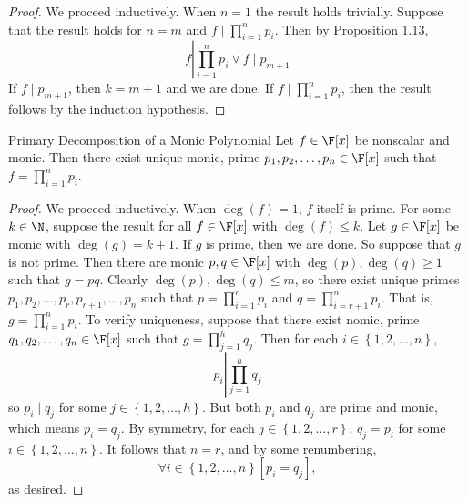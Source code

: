 \documentclass[linearalgebraII]{subfiles}
\begin{document}
    \begin{proof}
        We proceed inductively. When $n=1$ the result holds trivially. Suppose that the result holds for $n=m$ and $f\mid \prod^n_{i=1} p_i$. Then by Proposition 1.13,
        \begin{equation*}
            f\left|\prod^n_{i=1} p_i \lor f\mid p_{m+1}\right.
        \end{equation*}
        If $f\mid p_{m+1}$, then $k=m+1$ and we are done. If $f\mid\prod^n_{i=1} p_i$, then the result follows by the induction hypothesis.
    \end{proof}

    \begin{theorem}{Primary Decomposition of a Monic Polynomial}
        Let $f\in \F[x]$ be nonscalar and monic. Then there exist unique monic, prime $p_1, p_2, \ldots, p_n\in \F[x]$ such that $f = \prod^n_{i=1} p_i$.
    \end{theorem}

    \begin{proof}
        We proceed inductively. When $\deg(f)=1$, $f$ itself is prime. For some $k\in \N$, suppose the result for all $f\in \F[x]$ with $\deg(f)\leq k$. Let $g\in \F[x]$ be monic with $\deg(g) = k+1$. If $g$ is prime, then we are done. So suppose that $g$ is not prime. Then there are monic $p, q\in \F[x]$ with $\deg(p),\deg(q)\geq 1$ such that $g=pq$. Clearly $\deg(p), \deg(q)\leq m$, so there exist unique primes $p_1, p_2, \ldots, p_r, p_{r+1}, \ldots, p_n$ such that $p =
        \prod^{r}_{i=1} p_i$ and $q = \prod^{n}_{i=r+1} p_i$. That is, $g = \prod^{n}_{i=1} p_i$. To verify uniqueness, suppose that there exist nomic, prime $q_1, q_2, \ldots, q_n\in \F[x]$ such that $g = \prod^{h}_{j=1} q_j$. Then for each $i\in \left\lbrace 1, 2, \ldots, n \right\rbrace$,
        \begin{equation*}
            p_i \left| \prod^{h}_{j=1} q_j\right. 
        \end{equation*}
        so $p_i\mid q_j$ for some $j\in \left\lbrace 1, 2, \ldots, h \right\rbrace$. But both $p_i$ and $q_j$ are prime and monic, which means $p_i = q_j$. By symmetry, for each $j\in \left\lbrace 1, 2, \ldots, r \right\rbrace$, $q_j = p_i$ for some $i\in \left\lbrace 1, 2, \ldots, n \right\rbrace$. It follows that $n = r$, and by some renumbering,
        \begin{equation*}
            \forall i\in \left\lbrace 1, 2, \ldots, n \right\rbrace \left[ p_i = q_j \right],
        \end{equation*}
        as desired.
    \end{proof}
\end{document}
